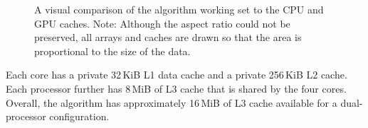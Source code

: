 \documentclass[preprint]{sigplanconf}
\begin{document}
\begin{figure}
\centering
{}
\label{fig:caches}
\caption{A visual comparison of the algorithm working set to the CPU and GPU
caches.  Note: Although the aspect ratio could not be preserved, all arrays and
caches are drawn so that the area is proportional to the size of the data. } 
\end{figure}

Each core has a private 32\,KiB L1 data cache and a private 256\,KiB L2 cache.
Each processor further has 8\,MiB of L3 cache that is shared by the four cores.
Overall, the algorithm has approximately 16\,MiB of L3 cache
available for a dual-processor configuration.  
\end{document}
